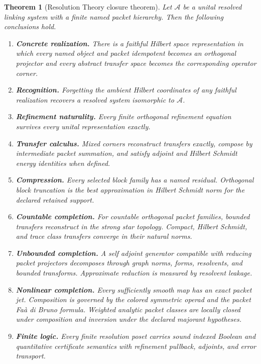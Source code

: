 \documentclass{aomart}
\newtheorem{theorem}{Theorem}[section]
\theoremstyle{definition}
\theoremstyle{remark}
\newcommand{\Acal}{\mathcal A}
\begin{document}
\begin{theorem}[Resolution Theory closure theorem]\label{thm:closure}
Let \(\Acal\) be a unital resolved linking system with a finite named packet hierarchy. Then the following conclusions hold.
\begin{enumerate}
\item \textbf{Concrete realization.} There is a faithful Hilbert space representation in which every named object and packet idempotent becomes an orthogonal projector and every abstract transfer space becomes the corresponding operator corner.
\item \textbf{Recognition.} Forgetting the ambient Hilbert coordinates of any faithful realization recovers a resolved system isomorphic to \(\Acal\).
\item \textbf{Refinement naturality.} Every finite orthogonal refinement equation survives every unital representation exactly.
\item \textbf{Transfer calculus.} Mixed corners reconstruct transfers exactly, compose by intermediate packet summation, and satisfy adjoint and Hilbert Schmidt energy identities when defined.
\item \textbf{Compression.} Every selected block family has a named residual. Orthogonal block truncation is the best approximation in Hilbert Schmidt norm for the declared retained support.
\item \textbf{Countable completion.} For countable orthogonal packet families, bounded transfers reconstruct in the strong star topology. Compact, Hilbert Schmidt, and trace class transfers converge in their natural norms.
\item \textbf{Unbounded completion.} A self adjoint generator compatible with reducing packet projectors decomposes through graph norms, forms, resolvents, and bounded transforms. Approximate reduction is measured by resolvent leakage.
\item \textbf{Nonlinear completion.} Every sufficiently smooth map has an exact packet jet. Composition is governed by the colored symmetric operad and the packet Faà di Bruno formula. Weighted analytic packet classes are locally closed under composition and inversion under the declared majorant hypotheses.
\item \textbf{Finite logic.} Every finite resolution poset carries sound indexed Boolean and quantitative certificate semantics with refinement pullback, adjoints, and error transport.
\end{enumerate}
\end{theorem}
\end{document}
